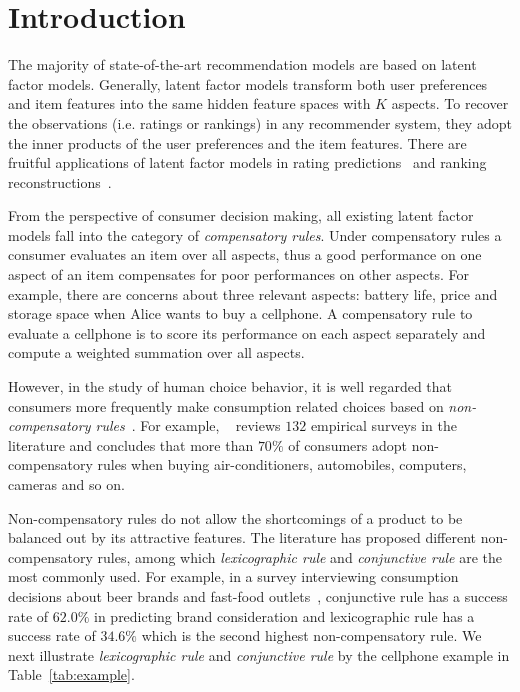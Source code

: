 \documentclass[letterpaper]{article} %
\begin{document}
\section{Introduction}\label{sec:introduction}
The majority of state-of-the-art recommendation models are based on latent factor models. Generally, latent factor models transform both user preferences and item features into the same hidden feature spaces with $K$ aspects. To recover the observations (i.e. ratings or rankings) in any recommender system, they adopt the inner products of the user preferences and the item features. There are fruitful applications of latent factor models in  rating predictions~\cite{Koren2009Matrix,Koren2010Factor,Lee2014Local} and ranking reconstructions~\cite{Rendle2009BPR,Steck2015Gaussian,Zhao2018Factored,Shi2010List}.   

From the perspective of consumer decision making, all existing latent factor models fall into the category of \emph{compensatory rules}. Under compensatory rules a consumer evaluates an item over all aspects, thus a good performance on one aspect of an item compensates for poor performances on other aspects. For example, there are concerns about three relevant aspects: battery life, price and storage space when Alice wants to buy a cellphone. A compensatory rule to evaluate a cellphone is to score its performance on each aspect separately and compute a weighted summation over all aspects.


However, in the study of human choice behavior, it is well regarded that consumers more frequently make consumption related choices based on \emph{non-compensatory rules}~\cite{Engel1986Consumer}. For example, ~\cite{Hauser2009Non} reviews $132$ empirical surveys in the literature and concludes that more than $70\%$ of consumers adopt non-compensatory rules when buying air-conditioners, automobiles, computers, cameras and so on. 

Non-compensatory rules do not allow the shortcomings of a product to be balanced out by its attractive features. The literature has proposed different non-compensatory rules, among which  \emph{lexicographic rule} and \emph{conjunctive rule} are the most commonly used. For example, in a survey interviewing consumption decisions about beer brands and fast-food outlets~\cite{Laroche2003Which}, conjunctive rule has a success rate of $62.0\%$ in predicting brand consideration and lexicographic rule has a success rate of $34.6\%$ which is the second highest non-compensatory rule. We next illustrate  \emph{lexicographic rule} and \emph{conjunctive rule}  by the cellphone example in Table~\ref{tab:example}. 
\end{document}
